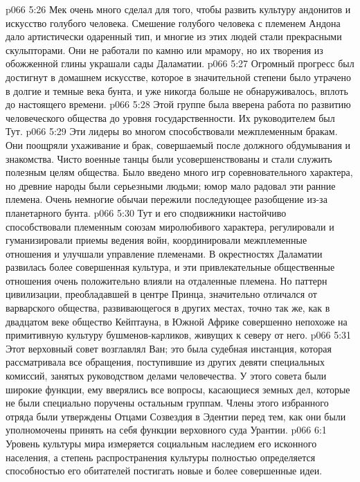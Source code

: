 \vs p066 5:26 Мек очень много сделал для того, чтобы развить культуру андонитов и искусство голубого человека. Смешение голубого человека с племенем Андона дало артистически одаренный тип, и многие из этих людей стали прекрасными скульпторами. Они не работали по камню или мрамору, но их творения из обожженной глины украшали сады Даламатии.
\vs p066 5:27 Огромный прогресс был достигнут в домашнем искусстве, которое в значительной степени было утрачено в долгие и темные века бунта, и уже никогда больше не обнаруживалось, вплоть до настоящего времени.
\vs p066 5:28 \bibnobreakspace {} Этой группе была вверена работа по развитию человеческого общества до уровня государственности. Их руководителем был Тут.
\vs p066 5:29 Эти лидеры во многом способствовали межплеменным бракам. Они поощряли ухаживание и брак, совершаемый после должного обдумывания и знакомства. Чисто военные танцы были усовершенствованы и стали служить полезным целям общества. Было введено много игр соревновательного характера, но древние народы были серьезными людьми; юмор мало радовал эти ранние племена. Очень немногие обычаи пережили последующее разобщение из\hyp{}за планетарного бунта.
\vs p066 5:30 Тут и его сподвижники настойчиво способствовали племенным союзам миролюбивого характера, регулировали и гуманизировали приемы ведения войн, координировали межплеменные отношения и улучшали управление племенами. В окрестностях Даламатии развилась более совершенная культура, и эти привлекательные общественные отношения очень положительно влияли на отдаленные племена. Но паттерн цивилизации, преобладавшей в центре Принца, значительно отличался от варварского общества, развивающегося в других местах, точно так же, как в двадцатом веке общество Кейптауна, в Южной Африке совершенно непохоже на примитивную культуру бушменов\hyp{}карликов, живущих к северу от него.
\vs p066 5:31 \bibnobreakspace {} Этот верховный совет возглавлял Ван; это была судебная инстанция, которая рассматривала все обращения, поступившие из других девяти специальных комиссий, занятых руководством делами человечества. У этого совета были широкие функции, ему вверялись все вопросы, касающиеся земных дел, которые не были специально поручены остальным группам. Члены этого избранного отряда были утверждены Отцами Созвездия в Эдентии перед тем, как они были уполномочены принять на себя функции верховного суда Урантии.
\vs p066 6:1 Уровень культуры мира измеряется социальным наследием его исконного населения, а степень распространения культуры полностью определяется способностью его обитателей постигать новые и более совершенные идеи.
